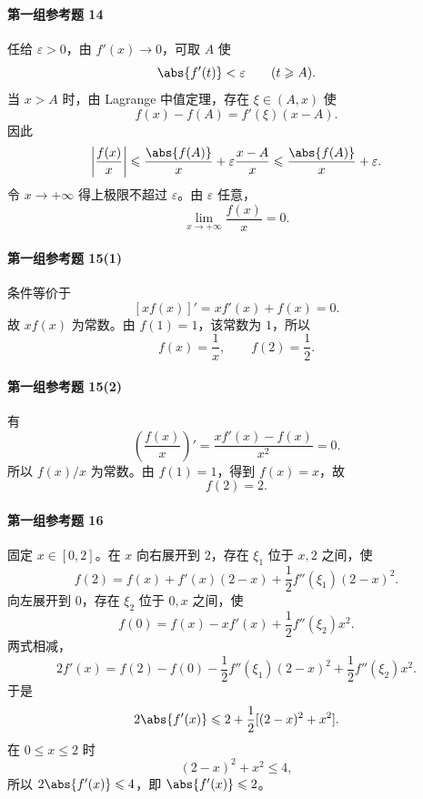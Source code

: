 \paragraph{第一组参考题 14}
\begin{xsolution}
任给 $\varepsilon>0$，由 $f'(x)\to0$，可取 $A$ 使
\[
  \abs{f'(t)}<\varepsilon\qquad(t\geqslant A).
\]
当 $x>A$ 时，由 Lagrange 中值定理，存在 $\xi\in(A,x)$ 使
\[
  f(x)-f(A)=f'(\xi)(x-A).
\]
因此
\[
  \left|\frac{f(x)}x\right|
  \leqslant\frac{\abs{f(A)}}x
   +\varepsilon\frac{x-A}{x}
  \leqslant\frac{\abs{f(A)}}x+\varepsilon.
\]
令 $x\to+\infty$ 得上极限不超过 $\varepsilon$。由 $\varepsilon$ 任意，
\[
  \lim_{x\to+\infty}\frac{f(x)}x=0.
\]
\end{xsolution}

\paragraph{第一组参考题 15(1)}
\begin{xsolution}
条件等价于
\[
  [xf(x)]'=xf'(x)+f(x)=0.
\]
故 $xf(x)$ 为常数。由 $f(1)=1$，该常数为 $1$，所以
\[
  f(x)=\frac1x,
  \qquad f(2)=\frac12.
\]
\end{xsolution}

\paragraph{第一组参考题 15(2)}
\begin{xsolution}
有
\[
  \left(\frac{f(x)}x\right)'
  =\frac{xf'(x)-f(x)}{x^2}=0.
\]
所以 $f(x)/x$ 为常数。由 $f(1)=1$，得到 $f(x)=x$，故
\[
  f(2)=2.
\]
\end{xsolution}

\paragraph{第一组参考题 16}
\begin{xsolution}
固定 $x\in[0,2]$。在 $x$ 向右展开到 $2$，存在 $\xi_1$ 位于 $x,2$ 之间，使
\[
  f(2)=f(x)+f'(x)(2-x)+\frac12f''(\xi_1)(2-x)^2.
\]
向左展开到 $0$，存在 $\xi_2$ 位于 $0,x$ 之间，使
\[
  f(0)=f(x)-xf'(x)+\frac12f''(\xi_2)x^2.
\]
两式相减，
\[
  2f'(x)=f(2)-f(0)
  -\frac12f''(\xi_1)(2-x)^2
  +\frac12f''(\xi_2)x^2.
\]
于是
\[
  2\abs{f'(x)}
  \leqslant2+\frac12[(2-x)^2+x^2].
\]
在 $0\leqslant x\leqslant2$ 时
\[
  (2-x)^2+x^2\leqslant4,
\]
所以 $2\abs{f'(x)}\leqslant4$，即 $\abs{f'(x)}\leqslant2$。
\end{xsolution}

